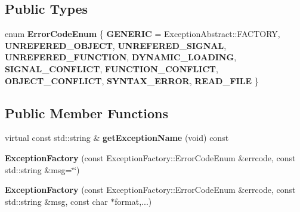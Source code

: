 \subsection*{Public Types}
\begin{DoxyCompactItemize}
\item 
\mbox{\label{classdynamic__graph_1_1ExceptionFactory_a61ed67b84bf03809ef3d6b4124e4c39d}} 
enum {\bfseries Error\+Code\+Enum} \{ \newline
{\bfseries G\+E\+N\+E\+R\+IC} = Exception\+Abstract\+:\+:F\+A\+C\+T\+O\+RY, 
{\bfseries U\+N\+R\+E\+F\+E\+R\+E\+D\+\_\+\+O\+B\+J\+E\+CT}, 
{\bfseries U\+N\+R\+E\+F\+E\+R\+E\+D\+\_\+\+S\+I\+G\+N\+AL}, 
{\bfseries U\+N\+R\+E\+F\+E\+R\+E\+D\+\_\+\+F\+U\+N\+C\+T\+I\+ON}, 
\newline
{\bfseries D\+Y\+N\+A\+M\+I\+C\+\_\+\+L\+O\+A\+D\+I\+NG}, 
{\bfseries S\+I\+G\+N\+A\+L\+\_\+\+C\+O\+N\+F\+L\+I\+CT}, 
{\bfseries F\+U\+N\+C\+T\+I\+O\+N\+\_\+\+C\+O\+N\+F\+L\+I\+CT}, 
{\bfseries O\+B\+J\+E\+C\+T\+\_\+\+C\+O\+N\+F\+L\+I\+CT}, 
\newline
{\bfseries S\+Y\+N\+T\+A\+X\+\_\+\+E\+R\+R\+OR}, 
{\bfseries R\+E\+A\+D\+\_\+\+F\+I\+LE}
 \}
\end{DoxyCompactItemize}
\subsection*{Public Member Functions}
\begin{DoxyCompactItemize}
\item 
\mbox{\label{classdynamic__graph_1_1ExceptionFactory_aa6445edd44eb90eeb3250c85fc5ffce4}} 
virtual const std\+::string \& {\bfseries get\+Exception\+Name} (void) const
\item 
\mbox{\label{classdynamic__graph_1_1ExceptionFactory_a761ecdb7e256d8e08ef57d8a30aa0304}} 
{\bfseries Exception\+Factory} (const Exception\+Factory\+::\+Error\+Code\+Enum \&errcode, const std\+::string \&msg=\char`\"{}\char`\"{})
\item 
\mbox{\label{classdynamic__graph_1_1ExceptionFactory_a7cf2af98062079786409dc9a2dcfd85a}} 
{\bfseries Exception\+Factory} (const Exception\+Factory\+::\+Error\+Code\+Enum \&errcode, const std\+::string \&msg, const char $\ast$format,...)
\end{DoxyCompactItemize}
